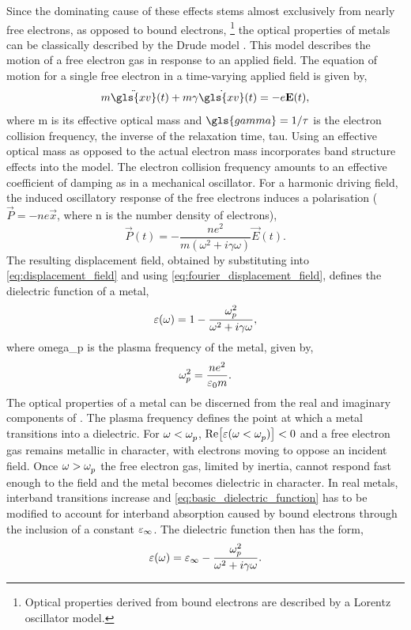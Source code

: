 \documentclass{article}
\begin{document}
Since the dominating cause of these effects stems almost exclusively from nearly free electrons, as opposed to bound electrons,%
\footnote{Optical properties derived from bound electrons are described by a Lorentz oscillator model.}
the optical properties of metals can be classically described by the Drude model \cite{drude1900}. This model describes the motion of a free electron gas in response to an applied field. The equation of motion for a single free electron in a time-varying applied field is given by,
\begin{equation}
	m\ddot{\gls{xv}}(t) + m\gamma \dot{\gls{xv}}(t) = -e\vec{E}(t),
\end{equation}
where \gls{m} is its effective optical mass and $\gls{gamma} = 1/\tau$ is the electron collision frequency, the inverse of the relaxation time, \gls{tau}. Using an effective optical mass as opposed to the actual electron mass incorporates band structure effects into the model. The electron collision frequency amounts to an effective coefficient of damping as in a mechanical oscillator. For a harmonic driving field, the induced oscillatory response of the free electrons induces a polarisation ($\vec{P} = -ne\vec{x}$, where \gls{n} is the number density of electrons),
\begin{equation}
	\vec{P}(t) = -\frac{ne^2}{m(\omega^2 + i\gamma\omega)}\vec{E}(t).
	\label{eq:P_solution}
\end{equation}
The resulting displacement field, obtained by substituting  into \eqref{eq:displacement_field} and using \eqref{eq:fourier_displacement_field}, defines the dielectric function of a metal,
\begin{equation}
	\eps(\omega) = 1 - \frac{\omegap[2]}{\omega^2 + i\gamma\omega},
	\label{eq:basic_dielectric_function}
\end{equation}
where \gls{omega_p} is the plasma frequency of the metal, given by,
\begin{equation}
	\omegap[2] = \frac{ne^2}{\varepsilon_0 m}.
	\label{eq:plasma_frequency}
\end{equation}
The optical properties of a metal can be discerned from the real and imaginary components of \dielectric. The plasma frequency defines the point at which a metal transitions into a dielectric. For $\omega<\omega_{p}^{}$, $\mathrm{Re}\!\left[{\varepsilon(\omega<\omega_{p}^{})}\right] < 0$ and a free electron gas remains metallic in character, with electrons moving to oppose an incident field. Once $\omega > \omega_{p}^{}$ the free electron gas, limited by inertia, cannot respond fast enough to the field and the metal becomes dielectric in character. In real metals, interband transitions increase \imag{\dielectric} and \eqref{eq:basic_dielectric_function} has to be modified to account for interband absorption caused by bound electrons through the inclusion of a constant $\varepsilon_\infty$. The dielectric function then has the form,
\begin{equation}
	\dielectric = \eps_\infty - \frac{\omegap[2]}{\omega^2 + i\gamma\omega}.
	\label{eq:dielectric_function}
\end{equation}
\end{document}
